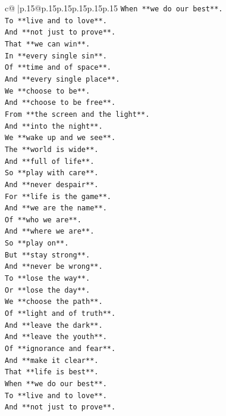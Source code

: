 \documentclass{article}
\begin{document}
{\begin{supertabular}{c@{$\;$}|p{.15\linewidth}@{}p{.15\linewidth}p{.15\linewidth}p{.15\linewidth}p{.15\linewidth}p{.15\linewidth}}
{{{\texttt{When **we do our best**.} \\
\texttt{To **live and to love**.} \\
\texttt{And **not just to prove**.} \\
\texttt{That **we can win**.} \\
\texttt{In **every single sin**.} \\
\texttt{Of **time and of space**.} \\
\texttt{And **every single place**.} \\
\texttt{We **choose to be**.} \\
\texttt{And **choose to be free**.} \\
\texttt{From **the screen and the light**.} \\
\texttt{And **into the night**.} \\
\texttt{We **wake up and we see**.} \\
\texttt{The **world is wide**.} \\
\texttt{And **full of life**.} \\
\texttt{So **play with care**.} \\
\texttt{And **never despair**.} \\
\texttt{For **life is the game**.} \\
\texttt{And **we are the name**.} \\
\texttt{Of **who we are**.} \\
\texttt{And **where we are**.} \\
\texttt{So **play on**.} \\
\texttt{But **stay strong**.} \\
\texttt{And **never be wrong**.} \\
\texttt{To **lose the way**.} \\
\texttt{Or **lose the day**.} \\
\texttt{We **choose the path**.} \\
\texttt{Of **light and of truth**.} \\
\texttt{And **leave the dark**.} \\
\texttt{And **leave the youth**.} \\
\texttt{Of **ignorance and fear**.} \\
\texttt{And **make it clear**.} \\
\texttt{That **life is best**.} \\
\texttt{When **we do our best**.} \\
\texttt{To **live and to love**.} \\
\texttt{And **not just to prove**.} \\
}}}
\end{supertabular}}
\end{document}
